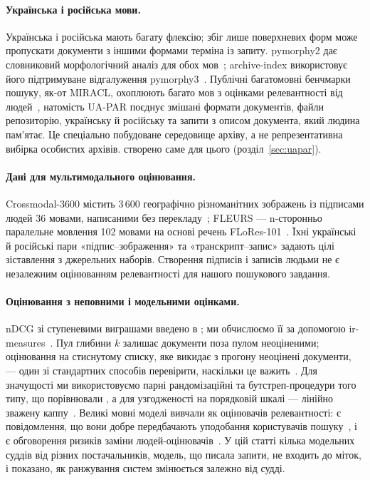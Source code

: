 \paragraph{Українська і російська мови.}
Українська і російська мають багату флексію; збіг лише поверхневих форм може пропускати документи з іншими формами терміна із запиту. pymorphy2 дає словниковий морфологічний аналіз для обох мов~\citep{korobov2015pymorphy}; archive-index використовує його підтримуване відгалуження pymorphy3~\citep{pymorphy3}. Публічні багатомовні бенчмарки пошуку, як-от MIRACL, охоплюють багато мов з оцінками релевантності від людей~\citep{zhang2023miracl}, натомість UA-PAR поєднує змішані формати документів, файли репозиторію, українську й російську та запити з описом документа, який людина пам'ятає. Це спеціально побудоване середовище архіву, а не репрезентативна вибірка особистих архівів. \uapar{} створено саме для цього (розділ~\ref{sec:uapar}).

\paragraph{Дані для мультимодального оцінювання.}
Crossmodal-3600 містить 3\,600 географічно різноманітних зображень із підписами людей 36 мовами, написаними без перекладу~\citep{thapliyal2022xm3600}; FLEURS --- n-сторонньо паралельне мовлення 102 мовами на основі речень FLoRes-101~\citep{conneau2023fleurs}. Їхні українські й російські пари «підпис--зображення» та «транскрипт--запис» задають цілі зіставлення з джерельних наборів. Створення підписів і записів людьми не є незалежним оцінюванням релевантності для нашого пошукового завдання.

\paragraph{Оцінювання з неповними і модельними оцінками.}
nDCG зі ступеневими виграшами введено в \citet{jarvelin2002ndcg}; ми обчислюємо її за допомогою ir-measures~\citep{macavaney2022irmeasures}. Пул глибини $k$ залишає документи поза пулом неоціненими; оцінювання на стиснутому списку, яке викидає з прогону неоцінені документи, --- один зі стандартних способів перевірити, наскільки це важить~\citep{sakai2007bpref}. Для значущості ми використовуємо парні рандомізаційні та бутстреп-процедури того типу, що порівнювали \citet{smucker2007significance}, а для узгодженості на порядковій шкалі --- лінійно зважену каппу~\citep{cohen1968kappa}. Великі мовні моделі вивчали як оцінювачів релевантності: є повідомлення, що вони добре передбачають уподобання користувачів пошуку~\citep{thomas2024llmjudge}, і є обговорення ризиків заміни людей-оцінювачів~\citep{faggioli2023perspectives}. У цій статті кілька модельних суддів від різних постачальників, модель, що писала запити, не входить до міток, і показано, як ранжування систем змінюється залежно від судді.

